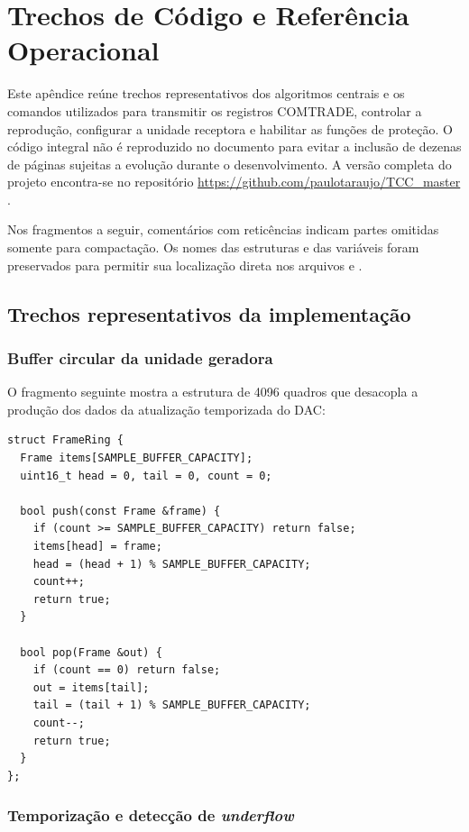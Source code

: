 \chapter{Trechos de Código e Referência Operacional}
\label{ap:comandos-execucao}

Este apêndice reúne trechos representativos dos algoritmos centrais e os comandos utilizados para transmitir os registros COMTRADE, controlar a reprodução, configurar a unidade receptora e habilitar as funções de proteção. O código integral não é reproduzido no documento para evitar a inclusão de dezenas de páginas sujeitas a evolução durante o desenvolvimento. A versão completa do projeto encontra-se no repositório \url{https://github.com/paulotaraujo/TCC_master} \cite{pereira_tcc_master_2026}.

Nos fragmentos a seguir, comentários com reticências indicam partes omitidas somente para compactação. Os nomes das estruturas e das variáveis foram preservados para permitir sua localização direta nos arquivos  e .

\section{Trechos representativos da implementação}

\subsection{Buffer circular da unidade geradora}

O fragmento seguinte mostra a estrutura de 4096 quadros que desacopla a produção dos dados da atualização temporizada do DAC:

\begin{verbatim}
struct FrameRing {
  Frame items[SAMPLE_BUFFER_CAPACITY];
  uint16_t head = 0, tail = 0, count = 0;

  bool push(const Frame &frame) {
    if (count >= SAMPLE_BUFFER_CAPACITY) return false;
    items[head] = frame;
    head = (head + 1) % SAMPLE_BUFFER_CAPACITY;
    count++;
    return true;
  }

  bool pop(Frame &out) {
    if (count == 0) return false;
    out = items[tail];
    tail = (tail + 1) % SAMPLE_BUFFER_CAPACITY;
    count--;
    return true;
  }
};
\end{verbatim}

\subsection{Temporização e detecção de \textit{underflow}}


